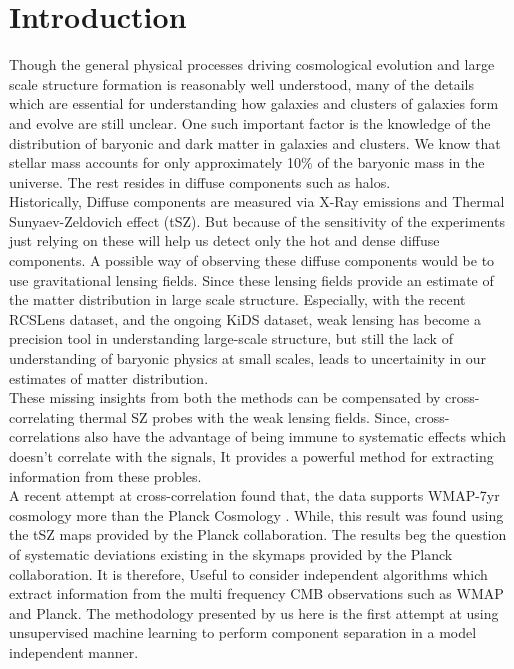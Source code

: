\chapter{Introduction}
Though the general physical processes driving cosmological evolution and 
large scale structure formation is reasonably well understood, many of the 
details which are essential for understanding how galaxies and clusters of 
galaxies form and evolve are still unclear. One such important factor is the 
knowledge of the distribution of baryonic and dark matter in galaxies and
clusters. We know that stellar mass accounts for only approximately 10\% of the 
baryonic mass in the universe. The rest resides in diffuse components such as halos. 
\\
Historically, Diffuse components are measured via X-Ray emissions and Thermal 
Sunyaev-Zeldovich effect (tSZ). But because of the sensitivity of the experiments
just relying on these will help us detect only the hot and dense diffuse
components.  A possible way of observing these diffuse components would be to 
use gravitational lensing fields. Since these lensing fields
provide an estimate of the matter distribution in large scale structure. 
Especially, with the recent RCSLens dataset, and the ongoing KiDS dataset, weak 
lensing has become a precision tool in understanding large-scale structure, but
still the lack of understanding of baryonic physics at small scales, leads to
uncertainity in our estimates of matter distribution. \\
These missing insights from both the methods can be compensated by cross-correlating thermal SZ probes with the weak lensing fields. Since,
cross-correlations also have the advantage of being immune to systematic effects 
which doesn't correlate with the signals, It provides a powerful method 
for extracting information from these probles. 
\\
A recent attempt at cross-correlation found that, the data supports 
WMAP-7yr cosmology more than the Planck Cosmology \cite{tszrcscross}.
While, this result was found using the tSZ maps provided by the Planck
collaboration. The results beg the question of systematic deviations 
existing in the skymaps provided by the Planck collaboration. 
It is therefore, Useful to consider independent algorithms which extract 
information from the multi frequency CMB observations such as WMAP and
Planck. The methodology presented by us here is the first attempt at 
using unsupervised machine learning to perform component separation in a
model independent manner.

